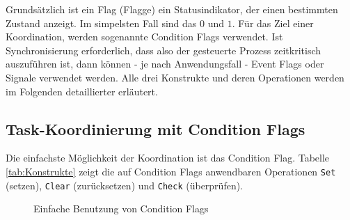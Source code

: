 \documentclass{llncs}
\begin{document}
\begin{table}
	\centering %
	\def\arraystretch{1.5} %
	\setlength{\tabcolsep}{0.5em} %
\caption{\label{tab:Konstrukte} Koordinierungs- und Synchronisationskonstrukte \autocite[vgl.][82]{Cooling2017}}
\end{table}
Grundsätzlich ist ein Flag (Flagge) ein Statusindikator, der einen bestimmten Zustand anzeigt. Im simpelsten Fall sind das $0$ und $1$. Für das Ziel einer Koordination, werden sogenannte Condition Flags verwendet. Ist Synchronisierung erforderlich, dass also der gesteuerte Prozess zeitkritisch auszuführen ist, dann können - je nach Anwendungsfall - Event Flags oder Signale verwendet werden. Alle drei Konstrukte und deren Operationen werden im Folgenden detaillierter erläutert.

\subsection{Task-Koordinierung mit Condition Flags}
\label{subsec:Koordinierung_mit_Condition_Flags}
Die einfachste Möglichkeit der Koordination ist das Condition Flag. Tabelle \ref{tab:Konstrukte} zeigt die auf Condition Flags anwendbaren Operationen \texttt{Set} (setzen), \texttt{Clear} (zurücksetzen) und \texttt{Check} (überprüfen).

\begin{figure}[h]
\centering
\def\svgwidth{300pt}

\caption{\label{fig:ConditionFlag} Einfache Benutzung von Condition Flags \autocite[vgl.][83]{Cooling2017}}
\end{figure}
\end{document}
